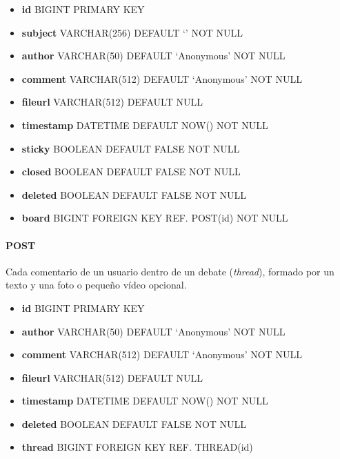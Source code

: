 \documentclass[12pt,a4paper,titlepage]{article}
\begin{document}
    \begin{itemize}
        \item \textbf{id} BIGINT PRIMARY KEY
        \item \textbf{subject} VARCHAR(256) DEFAULT `' NOT NULL
        \item \textbf{author} VARCHAR(50) DEFAULT `Anonymous' NOT NULL
        \item \textbf{comment} VARCHAR(512) DEFAULT `Anonymous' NOT NULL
        \item \textbf{fileurl} VARCHAR(512) DEFAULT NULL
        \item \textbf{timestamp} DATETIME DEFAULT NOW() NOT NULL
        \item \textbf{sticky} BOOLEAN DEFAULT FALSE NOT NULL
        \item \textbf{closed} BOOLEAN DEFAULT FALSE NOT NULL
        \item \textbf{deleted} BOOLEAN DEFAULT FALSE NOT NULL
        \item \textbf{board} BIGINT FOREIGN KEY REF. POST(id) NOT NULL
    \end{itemize}

    \paragraph{POST} Cada comentario de un usuario dentro de un debate (\textit{thread}), formado por un texto y una foto o pequeño vídeo opcional.

    \begin{itemize}
        \item \textbf{id} BIGINT PRIMARY KEY
        \item \textbf{author} VARCHAR(50) DEFAULT `Anonymous' NOT NULL
        \item \textbf{comment} VARCHAR(512) DEFAULT `Anonymous' NOT NULL
        \item \textbf{fileurl} VARCHAR(512) DEFAULT NULL
        \item \textbf{timestamp} DATETIME DEFAULT NOW() NOT NULL
        \item \textbf{deleted} BOOLEAN DEFAULT FALSE NOT NULL
        \item \textbf{thread} BIGINT FOREIGN KEY REF. THREAD(id)
    \end{itemize}

    
\end{document}
